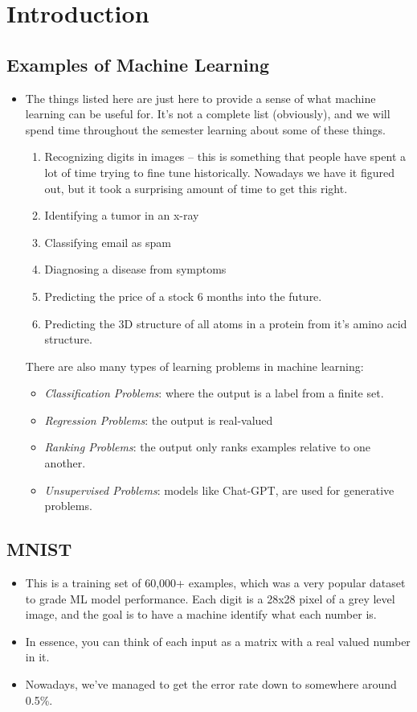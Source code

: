 \section{Introduction}

\subsection{Examples of Machine Learning}
\begin{itemize}
	\item The things listed here are just here to provide a sense of what machine learning can
		be useful for. It's not a complete list (obviously), and we will spend time
		throughout the semester learning about some of these things. 
		\begin{enumerate}[label=\roman*.]
			\item Recognizing digits in images -- this is something that people have spent a
				lot of time trying to fine tune historically. Nowadays we have it figured
				out, but it took a surprising amount of time to get this right. 
			\item Identifying a tumor in an x-ray
			\item Classifying email as spam
			\item Diagnosing a disease from symptoms
			\item Predicting the price of a stock 6 months into the future. 
			\item Predicting the 3D structure of all atoms in a protein from it's amino acid
				structure. 
		\end{enumerate}
		There are also many types of learning problems in machine learning: 
		\begin{itemize}
			\item \textit{Classification Problems}: where the output is a label from a finite
				set. 
			\item \textit{Regression Problems}: the output is real-valued 
			\item \textit{Ranking Problems}: the output only ranks examples relative
				to one another.
			\item \textit{Unsupervised Problems}: models like Chat-GPT, are used for
				generative problems. 
		\end{itemize}
\end{itemize}
\subsection{MNIST}
\begin{itemize}
	\item This is a training set of 60,000+ examples, which was a very popular dataset to grade
		ML model performance. Each digit is a 28x28 pixel of a grey level image, and the goal
		is to have a machine identify what each number is. 
	\item In essence, you can think of each
		input as a matrix with a real valued number in it.
	\item Nowadays, we've managed to get
		the error rate down to somewhere around 0.5\%. 

\end{itemize}

